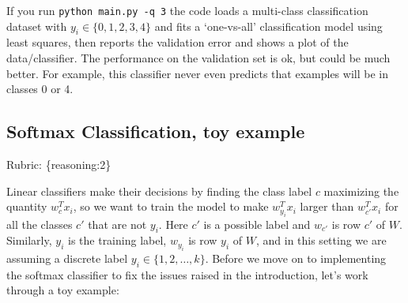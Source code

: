 \documentclass{article}
\def\rubric#1{\gre{Rubric: \{#1\}}}{}
\def\gre#1{{\color{gre}#1}}
\begin{document}
If you run \verb|python main.py -q 3| the code loads a multi-class
classification dataset with $y_i \in \{0,1,2,3,4\}$ and fits a `one-vs-all' classification
model using least squares, then reports the validation error and shows a plot of the data/classifier.
The performance on the validation set is ok, but could be much better.
For example, this classifier never even predicts that examples will be in classes 0 or 4.


\subsection{Softmax Classification, toy example}
\rubric{reasoning:2}

Linear classifiers make their decisions by finding the class label $c$ maximizing the quantity $w_c^Tx_i$, so we want to train the model to make $w_{y_i}^Tx_i$ larger than $w_{c'}^Tx_i$ for all the classes $c'$ that are not $y_i$. 
Here $c'$ is a possible label and $w_{c'}$ is row $c'$ of $W$. Similarly, $y_i$ is the training label, $w_{y_i}$ is row $y_i$ of $W$, and in this setting we are assuming a discrete label $y_i \in \{1,2,\dots,k\}$. Before we move on to implementing the softmax classifier to fix the issues raised in the introduction, let's work through a toy example:
\end{document}
